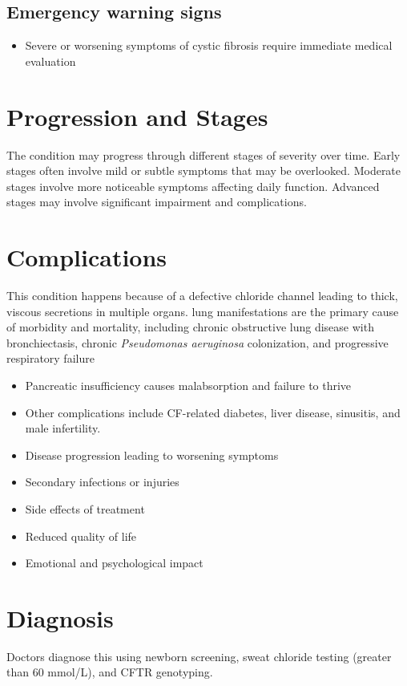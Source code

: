 \subsection{Emergency warning signs}
\begin{itemize}[noitemsep]
  \item Severe or worsening symptoms of cystic fibrosis require immediate medical evaluation
\end{itemize}
\section{Progression and Stages}
The condition may progress through different stages of severity over time. Early stages often involve mild or subtle symptoms that may be overlooked. Moderate stages involve more noticeable symptoms affecting daily function. Advanced stages may involve significant impairment and complications.
\section{Complications}
This condition happens because of a defective chloride channel leading to thick, viscous secretions in multiple organs. lung manifestations are the primary cause of morbidity and mortality, including chronic obstructive lung disease with bronchiectasis, chronic \textit{Pseudomonas aeruginosa} colonization, and progressive respiratory failure

\begin{itemize}[noitemsep]
  \item Pancreatic insufficiency causes malabsorption and failure to thrive
  \item Other complications include CF-related diabetes, liver disease, sinusitis, and male infertility.
  \item Disease progression leading to worsening symptoms
  \item Secondary infections or injuries
  \item Side effects of treatment
  \item Reduced quality of life
  \item Emotional and psychological impact
\end{itemize}
\section{Diagnosis}
Doctors diagnose this using newborn screening, sweat chloride testing (greater than 60 mmol/L), and CFTR genotyping.

